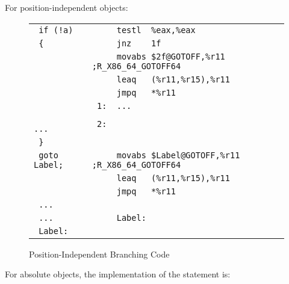 For position-independent objects:

\begin{figure}[H]
\Hrule
\caption{Position-Independent Branching Code}\label{large_pic_branching}
\begin{footnotesize}
\begin{tabular}{|l|l|}
\hline
\verb# if (!a)    # & \verb#     testl  %eax,%eax          # \\
\verb# {          # & \verb#     jnz    1f                 # \\
\verb#            # & \verb#     movabs $2f@GOTOFF,%r11    ;R_X86_64_GOTOFF64# \\
\verb#            # & \verb#     leaq   (%r11,%r15),%r11   # \\
\verb#            # & \verb#     jmpq   *%r11              # \\
\verb#            # & \verb# 1:  ...                       # \\
\verb#         ...# & \verb# 2:                            # \\
\verb# }          # & \verb#                               # \\
\hline
\verb# goto Label;# & \verb#     movabs $Label@GOTOFF,%r11 ;R_X86_64_GOTOFF64# \\
\verb#            # & \verb#     leaq   (%r11,%r15),%r11   # \\
\verb#            # & \verb#     jmpq   *%r11              # \\
\verb# ...        # & \verb#                               # \\
\verb# ...        # & \verb#     Label:                    # \\
\verb# Label:     # & \verb#                               # \\
\hline
\end{tabular}
\end{footnotesize}
\end{figure}

For absolute objects, the implementation of the  statement is:

